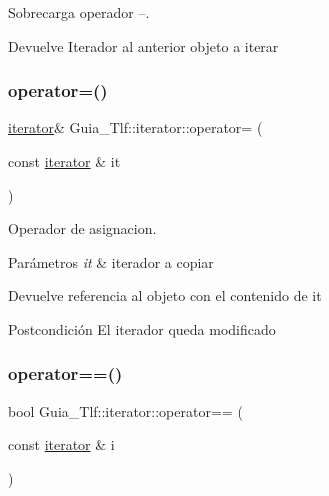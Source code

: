 Sobrecarga operador --. 

\begin{DoxyReturn}{Devuelve}
Iterador al anterior objeto a iterar 
\end{DoxyReturn}
\mbox{\label{classGuia__Tlf_1_1iterator_ac23d53e2211c9e379d910b4ca6354a1c}} 
\subsubsection{\texorpdfstring{operator=()}{operator=()}}
{\footnotesize\ttfamily \hyperlink{classGuia__Tlf_1_1iterator}{iterator}\& Guia\+\_\+\+Tlf\+::iterator\+::operator= (\begin{DoxyParamCaption}\item[{const \hyperlink{classGuia__Tlf_1_1iterator}{iterator} \&}]{it }\end{DoxyParamCaption})}



Operador de asignacion. 


\begin{DoxyParams}{Parámetros}
{\em it} & iterador a copiar \\
\hline
\end{DoxyParams}
\begin{DoxyReturn}{Devuelve}
referencia al objeto con el contenido de it 
\end{DoxyReturn}
\begin{DoxyPostcond}{Postcondición}
El iterador queda modificado 
\end{DoxyPostcond}
\mbox{\label{classGuia__Tlf_1_1iterator_ab4b046aff7151ba197b789091b65aa49}} 
\subsubsection{\texorpdfstring{operator==()}{operator==()}}
{\footnotesize\ttfamily bool Guia\+\_\+\+Tlf\+::iterator\+::operator== (\begin{DoxyParamCaption}\item[{const \hyperlink{classGuia__Tlf_1_1iterator}{iterator} \&}]{i }\end{DoxyParamCaption})}



